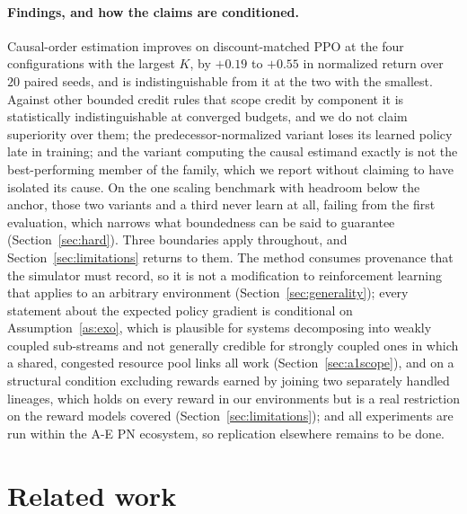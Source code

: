 \documentclass[review,authoryear,3p,times]{elsarticle}
\begin{document}
\paragraph{Findings, and how the claims are conditioned.}
Causal-order estimation improves on discount-matched PPO at the four
configurations with the largest $K$, by $+0.19$ to $+0.55$ in normalized return
over $20$ paired seeds, and is indistinguishable from it at the two with the
smallest. Against other bounded credit rules that scope credit by component it
is statistically indistinguishable at converged budgets, and we do not claim
superiority over them; the predecessor-normalized variant loses its learned
policy late in training; and the variant computing the causal estimand exactly
is not the best-performing member of the family, which we report without
claiming to have isolated its cause. On the one scaling benchmark with headroom
below the anchor, those two variants and a third never learn at all, failing
from the first evaluation, which narrows what boundedness can be said to
guarantee (Section~\ref{sec:hard}). Three boundaries apply throughout, and
Section~\ref{sec:limitations} returns to them. The method consumes provenance
that the simulator must record, so it is not a modification to reinforcement
learning that applies to an arbitrary environment
(Section~\ref{sec:generality}); every statement about the expected policy
gradient is conditional on Assumption~\ref{as:exo}, which is plausible for
systems decomposing into weakly coupled sub-streams and not generally credible
for strongly coupled ones in which a shared, congested resource pool links all
work (Section~\ref{sec:a1scope}), and on a structural condition excluding
rewards earned by joining two separately handled lineages, which holds on every
reward in our environments but is a real restriction on the reward models
covered (Section~\ref{sec:limitations}); and all experiments are run within the
A-E PN ecosystem, so replication elsewhere remains to be done.

\section{Related work}
\label{sec:related}
\end{document}
